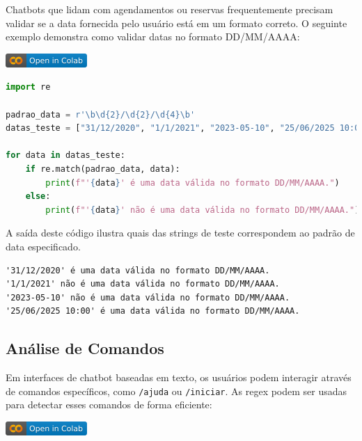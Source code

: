 \documentclass[14pt,a4paper,oneside]{book}
\begin{document}
Chatbots que lidam com agendamentos ou reservas frequentemente precisam validar se a data fornecida pelo usuário está em um formato correto. O seguinte exemplo demonstra como validar datas no formato DD/MM/AAAA:

\vspace{\baselineskip}
\href{https://colab.research.google.com/github/giseldo/chatbotbook/blob/main/notebook/cap11_2.ipynb}{
  \includegraphics{./fig/colab-badge.png}
}

\begin{lstlisting}[language=Python, caption=Validação de datas com regex, label=lst:validacao_data]
import re

padrao_data = r'\b\d{2}/\d{2}/\d{4}\b'
datas_teste = ["31/12/2020", "1/1/2021", "2023-05-10", "25/06/2025 10:00"]

for data in datas_teste:
    if re.match(padrao_data, data):
        print(f"'{data}' é uma data válida no formato DD/MM/AAAA.")
    else:
        print(f"'{data}' não é uma data válida no formato DD/MM/AAAA.")
\end{lstlisting}
A saída deste código ilustra quais das strings de teste correspondem ao padrão de data especificado.

\begin{lstlisting}
'31/12/2020' é uma data válida no formato DD/MM/AAAA.
'1/1/2021' não é uma data válida no formato DD/MM/AAAA.
'2023-05-10' não é uma data válida no formato DD/MM/AAAA.
'25/06/2025 10:00' é uma data válida no formato DD/MM/AAAA.
\end{lstlisting}

\subsection{Análise de Comandos}

Em interfaces de chatbot baseadas em texto, os usuários podem interagir através de comandos específicos, como \texttt{/ajuda} ou \texttt{/iniciar}. As regex podem ser usadas para detectar esses comandos de forma eficiente:

\vspace{\baselineskip}
\href{https://colab.research.google.com/github/giseldo/chatbotbook/blob/main/notebook/cap11_3.ipynb}{
  \includegraphics{./fig/colab-badge.png}
}
\end{document}
